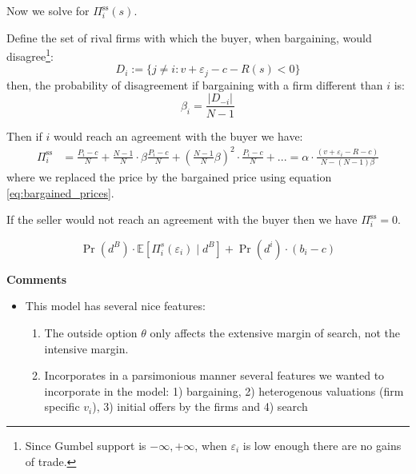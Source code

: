 \documentclass[12pt]{article}
\theoremstyle{plain}
\theoremstyle{plain}
\begin{document}
Now we solve for $\Pi^{\text{ss}}_i(s)$. 

Define the set of rival firms with which the buyer, when bargaining, would disagree\footnote{Since Gumbel support is \( -\infty, +\infty \), when \( \varepsilon_i \) is low enough there are no gains of trade.}: 
\[
D_i := \{j \neq i : v + \varepsilon_j - c - R(s) < 0\}
\]
then, the probability of disagreement if bargaining with a firm different than $i$ is: 
$$
\beta_i = \frac{|D_{-i}|}{N - 1} 
$$



Then if $i$ would reach an agreement with the buyer we have: 
\begin{align*}
\Pi^{\text{ss}}_i &= \frac{P_i - c}{N} 
+ \frac{N - 1}{N} \cdot \beta \frac{P_i - c}{N} 
+ \left( \frac{N - 1}{N} \beta \right)^2 \cdot \frac{P_i - c}{N} + ... 
 = \alpha \cdot \frac{(v + \varepsilon_i - R - c)}{N - (N-1)\beta}
\end{align*}
where we replaced the price by the bargained price using equation \ref{eq:bargained_prices}. 

If the seller would not reach an agreement with the buyer then we have $\Pi^{\text{ss}}_i=0$. 

\[
\Pr(d^B) \cdot \mathbb{E} \left[ \Pi^s_i(\varepsilon_i) \mid d^B \right]
+ \Pr(d^i) \cdot (b_i - c)
\]

\textbf{Comments} 
\begin{itemize}

    \item This model has several nice features: 
    \begin{enumerate}
        \item The outside option $\theta$ only affects the extensive margin of search, not the intensive margin. 
        \item Incorporates in a parsimonious manner several features we wanted to incorporate in the model: 1) bargaining, 2) heterogenous valuations (firm specific $v_i$), 3) initial offers by the firms and 4) search  
    \end{enumerate}
\end{itemize}
\end{document}
